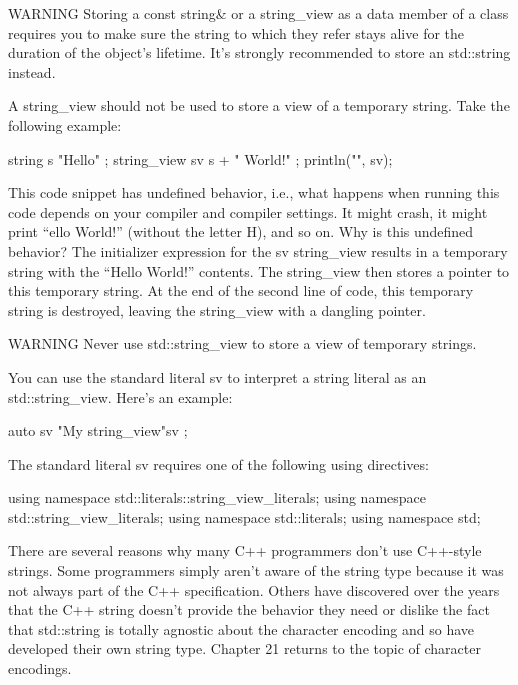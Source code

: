\begin{myWarning}{WARNING}
Storing a const string\& or a string\_view as a data member of a class requires you to make sure the string to which they refer stays alive for the duration of the object’s lifetime. It’s strongly recommended to store an std::string instead.
\end{myWarning}


A string\_view should not be used to store a view of a temporary string. Take the following example:

\begin{cpp}
string s { "Hello" };
string_view sv { s + " World!" };
println("{}", sv);
\end{cpp}

This code snippet has undefined behavior, i.e., what happens when running this code depends on your compiler and compiler settings. It might crash, it might print “ello World!” (without the letter H), and so on. Why is this undefined behavior? The initializer expression for the sv string\_view results in a temporary string with the “Hello World!” contents. The string\_view then stores a pointer to this temporary string. At the end of the second line of code, this temporary string is destroyed, leaving the string\_view with a dangling pointer.

\begin{myWarning}{WARNING}
Never use std::string\_view to store a view of temporary strings.
\end{myWarning}


You can use the standard literal sv to interpret a string literal as an std::string\_view. Here’s an example:

\begin{cpp}
auto sv { "My string_view"sv };
\end{cpp}

The standard literal sv requires one of the following using directives:

\begin{cpp}
using namespace std::literals::string_view_literals;
using namespace std::string_view_literals;
using namespace std::literals;
using namespace std;
\end{cpp}


There are several reasons why many C++ programmers don’t use C++-style strings. Some programmers simply aren’t aware of the string type because it was not always part of the C++ specification. Others have discovered over the years that the C++ string doesn’t provide the behavior they need or dislike the fact that std::string is totally agnostic about the character encoding and so have developed their own string type. Chapter 21 returns to the topic of character encodings.

